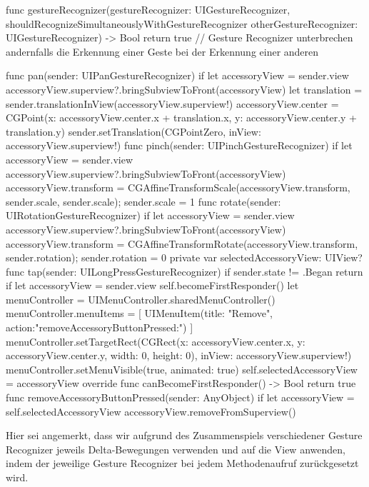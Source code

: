 \documentclass[parskip=half, final]{scrreprt}
\begin{document}
\begin{lecture}
\begin{itemize}
\begin{swiftcode}
    func gestureRecognizer(gestureRecognizer: UIGestureRecognizer, shouldRecognizeSimultaneouslyWithGestureRecognizer otherGestureRecognizer: UIGestureRecognizer) -> Bool {
        return true // Gesture Recognizer unterbrechen andernfalls die Erkennung einer Geste bei der Erkennung einer anderen
    }
    
    func pan(sender: UIPanGestureRecognizer) {
        if let accessoryView = sender.view {
            accessoryView.superview?.bringSubviewToFront(accessoryView)
            let translation = sender.translationInView(accessoryView.superview!)
            accessoryView.center = CGPoint(x: accessoryView.center.x + translation.x, y: accessoryView.center.y + translation.y)
            sender.setTranslation(CGPointZero, inView: accessoryView.superview!)
        }
    }
    func pinch(sender: UIPinchGestureRecognizer) {
        if let accessoryView = sender.view {
            accessoryView.superview?.bringSubviewToFront(accessoryView)
            accessoryView.transform = CGAffineTransformScale(accessoryView.transform, sender.scale, sender.scale);
            sender.scale = 1
        }
    }
    func rotate(sender: UIRotationGestureRecognizer) {
        if let accessoryView = sender.view {
            accessoryView.superview?.bringSubviewToFront(accessoryView)
            accessoryView.transform = CGAffineTransformRotate(accessoryView.transform, sender.rotation);
            sender.rotation = 0
        }
    }
    private var selectedAccessoryView: UIView?
    func tap(sender: UILongPressGestureRecognizer) {
        if sender.state != .Began {
            return
        }
        if let accessoryView = sender.view {
            self.becomeFirstResponder()
            let menuController = UIMenuController.sharedMenuController()
            menuController.menuItems = [ UIMenuItem(title: "Remove", action:"removeAccessoryButtonPressed:") ]
            menuController.setTargetRect(CGRect(x: accessoryView.center.x, y: accessoryView.center.y, width: 0, height: 0), inView: accessoryView.superview!)
            menuController.setMenuVisible(true, animated: true)
            self.selectedAccessoryView = accessoryView
        }
    }
    override func canBecomeFirstResponder() -> Bool {
        return true
    }
    func removeAccessoryButtonPressed(sender: AnyObject) {
        if let accessoryView = self.selectedAccessoryView {
            accessoryView.removeFromSuperview()
        }
    }
\end{swiftcode}

Hier sei angemerkt, dass wir aufgrund des Zusammenspiels verschiedener Gesture Recognizer jeweils Delta-Bewegungen verwenden und auf die View anwenden, indem der jeweilige Gesture Recognizer bei jedem Methodenaufruf zurückgesetzt wird.


\end{itemize}
\end{lecture}
\end{document}
